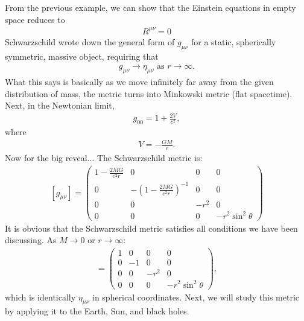 \documentclass{article}
\theoremstyle{definition}
\begin{document}
From the previous example, we can show that the Einstein equations in empty space reduces to
\begin{align*}
\boxed{R^{\mu\nu} = 0}
\end{align*}
Schwarzschild wrote down the general form of $g_{\mu\nu}$ for a static, spherically symmetric, massive object, requiring that
\begin{align*}
g_{\mu\nu} \rightarrow \eta_{\mu\nu} \text{ as } r \rightarrow \infty.
\end{align*} 
What this says is basically as we move infinitely far away from the given distribution of mass, the metric turns into Minkowski metric (flat spacetime). Next, in the Newtonian limit, 
\begin{align*}
g_{00} = 1 + \frac{2V}{c^2},
\end{align*}
where 
\begin{align*}
V = -\frac{GM}{r}.
\end{align*}
Now for the big reveal... The Schwarzschild metric is:
\begin{align*}
\boxed{[g_{\mu\nu}]
=
\begin{pmatrix}
1 - \frac{2MG}{c^2r} & 0 & 0 & 0\\
0 & -\left(1 - \frac{2MG}{c^2r} \right) ^{-1} & 0 & 0\\
0 & 0 & -r^2 & 0\\
0 & 0 & 0 & -r^2\sin^2\theta
\end{pmatrix}
}
\end{align*}
It is obvious that the Schwarzschild metric satisfies all conditions we have been discussing. As $M\rightarrow 0$ or $r \rightarrow \infty $:
\begin{align*}
[g_{\mu\nu}]  =
\begin{pmatrix}
1 & 0 & 0 & 0\\
0 & -1 & 0 & 0\\
0 & 0 & -r^2 & 0\\
0 & 0 & 0 & -r^2\sin^2\theta
\end{pmatrix},
\end{align*}
which is identically $\eta_{\mu\nu}$ in spherical coordinates. Next, we will study this metric by applying it to the Earth, Sun, and black holes. \\
\end{document}
